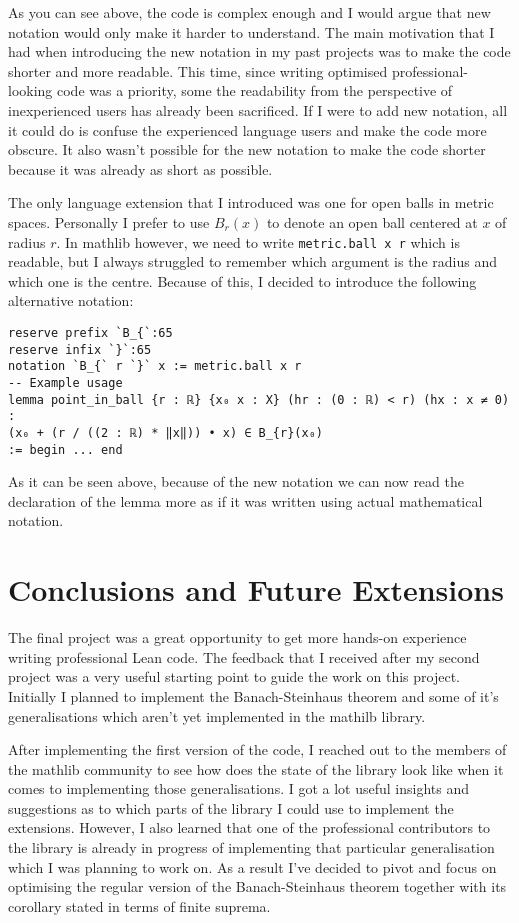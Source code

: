 \documentclass[11pt]{article}
\newenvironment{code}{\captionsetup{type=listing}}{}
\begin{document}
As you can see above, the code is complex enough and I would argue that new notation
would only make it harder to understand. The main motivation that I had when introducing
the new notation in my past projects was to make the code shorter and more readable.
This time, since writing optimised professional-looking code was a priority, some the
readability from the perspective of inexperienced users has already been sacrificed. If I were
to add new notation, all it could do is confuse the experienced language users
and make the code more obscure. It also wasn't possible for the new notation to make
the code shorter because it was already as short as possible.

The only language extension that I introduced was one for open balls in metric spaces.
Personally I prefer to use $B_r(x)$ to denote an open ball centered at  $x$ of radius
$r$. In mathlib however, we need to write \texttt{metric.ball x r} which is readable,
but I always struggled to remember which argument is the radius and which one
is the centre. Because of this, I decided to introduce the following alternative
notation:
 \begin{code}
\begin{verbatim}
reserve prefix `B_{`:65
reserve infix `}`:65
notation `B_{` r `}` x := metric.ball x r
-- Example usage
lemma point_in_ball {r : ℝ} {x₀ x : X} (hr : (0 : ℝ) < r) (hx : x ≠ 0) :
(x₀ + (r / ((2 : ℝ) * ‖x‖)) • x) ∈ B_{r}(x₀)
:= begin ... end
\end{verbatim}
\end{code}
As it can be seen above, because of the new notation we can now read the declaration
of the lemma more as if it was written using actual mathematical notation.
\section*{Conclusions and Future Extensions}

The final project was a great opportunity to get more hands-on experience
writing professional Lean code. The feedback that I received after my second project
was a very useful starting point to guide the work on this project. Initially I
planned to implement the Banach-Steinhaus theorem and some of it's generalisations
which aren't yet implemented in the mathilb library.

After implementing the first
version of the code, I reached out to the members of the mathlib community to see
how does the state of the library look like when it comes to implementing those
generalisations. I got a lot useful insights and suggestions as to which parts
of the library I could use to implement the extensions. However, I also learned
that one of the professional contributors to the library is already in progress
of implementing that particular generalisation which I was planning to work on.
As a result I've decided to pivot and focus on optimising the regular version
of the Banach-Steinhaus theorem together with its corollary stated in terms
of finite suprema.
\end{document}
